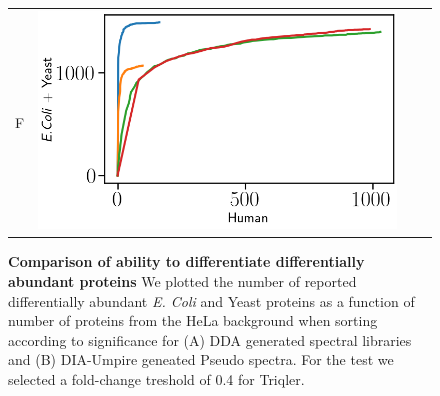 \documentclass[11pt]{article}
\begin{document}
\begin{figure}[hbt]
\begin{tabular}{lclc}
        F & \includegraphics[width=0.45\linewidth]{../../result/report_plots/diann_de_human_vs_ecoli_and_yeast.png} \\ 

    \end{tabular}
    \caption{{\bf Comparison of ability to differentiate differentially abundant proteins} We plotted the number of reported differentially abundant  {\em E. Coli} and Yeast proteins as a function of number of proteins from the HeLa background when sorting according to significance for (A) DDA generated spectral libraries and (B) DIA-Umpire geneated Pseudo spectra. For the test we selected a fold-change treshold of 0.4 for Triqler. \label{fig:diff_vs_hela}}
\end{figure}

\iffalse
\end{document}
